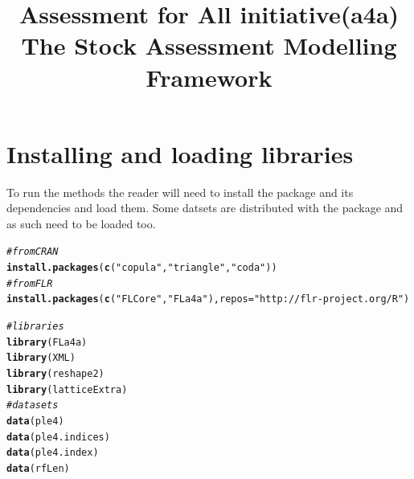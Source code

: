 \documentclass[a4paper,english,10pt]{article}\usepackage[]{graphicx}\usepackage[]{color}
\makeatletter
\newcommand{\hlstr}[1]{\textcolor[rgb]{0.192,0.494,0.8}{#1}}%
\newcommand{\hlcom}[1]{\textcolor[rgb]{0.678,0.584,0.686}{\textit{#1}}}%
\newcommand{\hlstd}[1]{\textcolor[rgb]{0.345,0.345,0.345}{#1}}%
\newcommand{\hlkwc}[1]{\textcolor[rgb]{0.333,0.667,0.333}{#1}}%
\newcommand{\hlkwd}[1]{\textcolor[rgb]{0.737,0.353,0.396}{\textbf{#1}}}%
\newenvironment{kframe}{%
 \def\at@end@of@kframe{}%
 \ifinner\ifhmode%
  \def\at@end@of@kframe{\end{minipage}}%
  \begin{minipage}{\columnwidth}%
 \fi\fi%
 \def\FrameCommand##1{\hskip\@totalleftmargin \hskip-\fboxsep
 \colorbox{shadecolor}{##1}\hskip-\fboxsep
     \hskip-\linewidth \hskip-\@totalleftmargin \hskip\columnwidth}%
 \MakeFramed {\advance\hsize-\width
   \@totalleftmargin\z@ \linewidth\hsize
   \@setminipage}}%
 {\par\unskip\endMakeFramed%
 \at@end@of@kframe}
\newenvironment{knitrout}{}{} %
\makeatother
\begin{document}
\title{Assessment for All initiative(a4a) \\ The \aFa Stock Assessment Modelling Framework}



\maketitle
\tableofcontents
\newpage


\section{Installing and loading libraries}

To run the  methods the reader will need to install the package and its dependencies and load them. Some datsets are distributed with the package and as such need to be loaded too.



\begin{knitrout}
\color{fgcolor}\begin{kframe}
\begin{alltt}
\hlcom{# from CRAN}
\hlkwd{install.packages}\hlstd{(}\hlkwd{c}\hlstd{(}\hlstr{"copula"}\hlstd{,} \hlstr{"triangle"}\hlstd{,} \hlstr{"coda"}\hlstd{))}
\hlcom{# from FLR}
\hlkwd{install.packages}\hlstd{(}\hlkwd{c}\hlstd{(}\hlstr{"FLCore"}\hlstd{,} \hlstr{"FLa4a"}\hlstd{),} \hlkwc{repos} \hlstd{=} \hlstr{"http://flr-project.org/R"}\hlstd{)}
\end{alltt}
\end{kframe}
\end{knitrout}

\begin{knitrout}
\color{fgcolor}\begin{kframe}
\begin{alltt}
\hlcom{# libraries}
\hlkwd{library}\hlstd{(FLa4a)}
\hlkwd{library}\hlstd{(XML)}
\hlkwd{library}\hlstd{(reshape2)}
\hlkwd{library}\hlstd{(latticeExtra)}
\hlcom{# datasets}
\hlkwd{data}\hlstd{(ple4)}
\hlkwd{data}\hlstd{(ple4.indices)}
\hlkwd{data}\hlstd{(ple4.index)}
\hlkwd{data}\hlstd{(rfLen)}
\end{alltt}
\end{kframe}
\end{knitrout}
\end{document}
